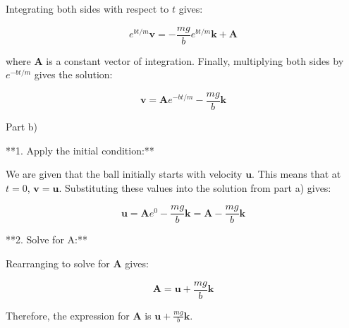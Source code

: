 \documentclass{article}
\begin{document}
Integrating both sides with respect to $t$ gives:

\begin{equation*}
e^{bt/m}\mathbf{v} = -\frac{mg}{b}e^{bt/m}\mathbf{k} + \mathbf{A}
\end{equation*}

where $\mathbf{A}$ is a constant vector of integration. Finally, multiplying both sides by $e^{-bt/m}$ gives the solution:

\begin{equation*}
\mathbf{v} = \mathbf{A}e^{-bt/m} - \frac{mg}{b}\mathbf{k}
\end{equation*}

Part b)

**1. Apply the initial condition:**

We are given that the ball initially starts with velocity $\mathbf{u}$. This means that at $t=0$, $\mathbf{v} = \mathbf{u}$. Substituting these values into the solution from part a) gives:

\begin{equation*}
\mathbf{u} = \mathbf{A}e^{0} - \frac{mg}{b}\mathbf{k} = \mathbf{A} - \frac{mg}{b}\mathbf{k}
\end{equation*}

**2. Solve for A:**

Rearranging to solve for $\mathbf{A}$ gives:

\begin{equation*}
\mathbf{A} = \mathbf{u} + \frac{mg}{b}\mathbf{k}
\end{equation*}

Therefore, the expression for $\mathbf{A}$ is $\mathbf{u} + \frac{mg}{b}\mathbf{k}$.
\end{document}
